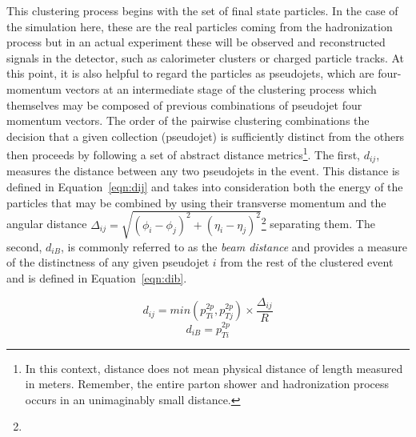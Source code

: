 \documentclass[UKenglish,texlive=2016]{\ATLASLATEXPATH atlasdoc}
\begin{document}
This clustering process begins with the set of final state particles.  In the case of the simulation here, these are the real particles coming from the hadronization process but in an actual experiment these will be observed and reconstructed signals in the detector, such as calorimeter clusters or charged particle tracks.  At this point, it is also helpful to regard the particles as pseudojets, which are four-momentum vectors at an intermediate stage of the clustering process which themselves may be composed of previous combinations of pseudojet four momentum vectors. The order of the pairwise clustering combinations the decision that a given collection (pseudojet) is sufficiently distinct from the others then proceeds by following a set of abstract distance metrics\footnote{In this context, distance does not mean physical distance of length measured in meters.  Remember, the entire parton shower and hadronization process occurs in an unimaginably small distance.}.  The first, $d_{ij}$, measures the distance between any two pseudojets in the event.  This distance is defined in Equation~\ref{eqn:dij} and takes into consideration both the energy of the particles that may be combined by using their transverse momentum \pt and the angular distance $\Delta_{ij}=\sqrt{(\phi_i-\phi_j)^2+(\eta_i-\eta_j)^2}$\footnote{} separating them.  The second, $d_{iB}$, is commonly referred to as the \textit{beam distance} and provides a measure of the distinctness of any given pseudojet $i$ from the rest of the clustered event and is defined in Equation~\ref{eqn:dib}.

\begin{equation}
\label{eqn:dij}
d_{ij}=min(p_{Ti}^{2p},p_{Tj}^{2p})\times \frac{\Delta_{ij}}{R}
\end{equation}
\begin{equation}
\label{eqn:dib}
d_{iB}=p_{Ti}^{2p}
\end{equation}
\end{document}
